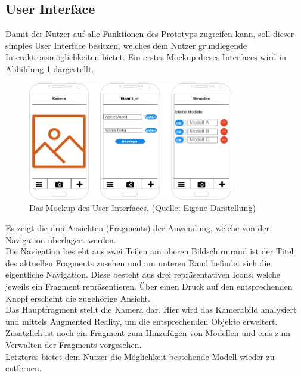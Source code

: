 \subsection{User Interface}
Damit der Nutzer auf alle Funktionen des Prototyps zugreifen kann, soll dieser simples User Interface besitzen, welches dem Nutzer grundlegende Interaktionsmöglichkeiten bietet. Ein erstes Mockup dieses Interfaces wird in Abbildung \ref{fig:ui-mockup} dargestellt.
\begin{figure}[h!]
\centering
\includegraphics[width=0.8\textwidth]{Abbildungen/ui-mockup.png}
\caption[UI Mockup]{Das Mockup des User Interfaces. (Quelle: Eigene Darstellung)}
\label{fig:ui-mockup}
\end{figure}
Es zeigt die drei Ansichten (Fragments) der Anwendung, welche von der Navigation überlagert werden. \\
Die Navigation besteht aus zwei Teilen am oberen Bildschirmrand ist der Titel des aktuellen Fragments zusehen und am unteren Rand befindet sich die eigentliche Navigation. Diese besteht aus drei repräsentativen Icons, welche jeweils ein Fragment repräsentieren. Über einen Druck auf den entsprechenden Knopf erscheint die zugehörige Ansicht.\\
Das Hauptfragment stellt die Kamera dar. Hier wird das Kamerabild analysiert und mittels Augmented Reality, um die entsprechenden Objekte erweitert. Zusätzlich ist noch ein Fragment zum Hinzufügen von Modellen und eins zum Verwalten der Fragments vorgesehen.\\
Letzteres bietet dem Nutzer die Möglichkeit bestehende Modell wieder zu entfernen.
